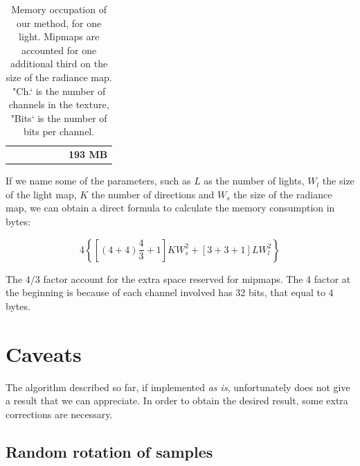 \begin{table}[!h]
\begin{tabular}{p{3cm}lllll|l|}
                                             &                                        &                                              &                                     &                                      &                & \textbf{193 MB}       \\ \cline{7-7} 
\end{tabular}
\caption{Memory occupation of our method, for one light. Mipmaps are accounted for one additional third on the size of the radiance map. "Ch.` is the number of channels in the texture, "Bits` is the number of bits per channel.}
\label{table:mlay}
\end{table}

If we name some of the parameters, such as $L$ as the number of lights, $W_l$ the size of the light map, $K$ the number of directions and $W_s$ the size of the radiance map, we can obtain a direct formula to calculate the memory consumption in bytes:

$$
4 \left\{ \left[\left(4 + 4\right) \frac{4}{3} + 1\right] K W_s^2 + \left[3 + 3 + 1\right] L W_l^2 \right\}
$$

The $4/3$ factor account for the extra space reserved for mipmaps. The 4 factor at the beginning is because of each channel involved has 32 bits, that equal to 4 bytes. 

\section{Caveats}
The algorithm described so far, if implemented \emph{as is}, unfortunately does not give a result that we can appreciate. In order to obtain the desired result, some extra corrections are necessary.

\subsection{Random rotation of samples}

